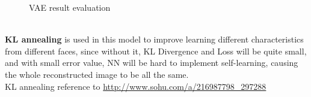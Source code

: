 \documentclass[11pt, a4paper]{article} %
\begin{document}
\begin{figure}[H]
    \hfill
    \hfill
    \caption{VAE result evaluation}
\end{figure}
\\ \textbf{KL annealing} is used in this model to improve learning different characteristics from different faces, since without it, KL Divergence and Loss will be quite small, and with small error value, NN will be hard to implement self-learning, causing the whole reconstructed image to be all the same.
\\ KL annealing reference to \url{http://www.sohu.com/a/216987798_297288}
\end{document}
